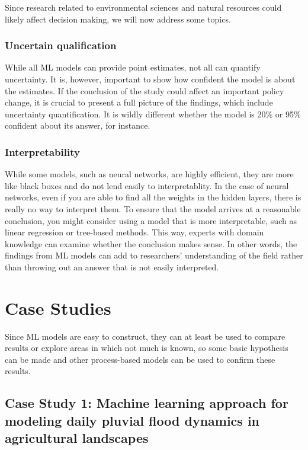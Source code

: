 \documentclass[
]{book}
\begin{document}
Since research related to environmental sciences and natural resources could likely affect decision making, we will now address some topics.

\hypertarget{uncertain-qualification}{%
\subsection{Uncertain qualification}\label{uncertain-qualification}}

While all ML models can provide point estimates, not all can quantify uncertainty. It is, however, important to show how confident the model is about the estimates. If the conclusion of the study could affect an important policy change, it is crucial to present a full picture of the findings, which include uncertainty quantification. It is wildly different whether the model is 20\% or 95\% confident about its answer, for instance.

\hypertarget{interpretability}{%
\subsection{Interpretability}\label{interpretability}}

While some models, such as neural networks, are highly efficient, they are more like black boxes and do not lend easily to interpretablity. In the case of neural networks, even if you are able to find all the weights in the hidden layers, there is really no way to interpret them. To ensure that the model arrives at a reasonable conclusion, you might consider using a model that is more interpretable, such as linear regression or tree-based methods. This way, experts with domain knowledge can examine whether the conclusion makes sense. In other words, the findings from ML models can add to researchers' understanding of the field rather than throwing out an answer that is not easily interpreted.

\hypertarget{case-studies}{%
\chapter{Case Studies}\label{case-studies}}

Since ML models are easy to construct, they can at least be used to compare results or explore areas in which not much is known, so some basic hypothesis can be made and other process-based models can be used to confirm these results.

\hypertarget{case-study-1-machine-learning-approach-for-modeling-daily-pluvial-flood-dynamics-in-agricultural-landscapes}{%
\section{Case Study 1: Machine learning approach for modeling daily pluvial flood dynamics in agricultural landscapes}\label{case-study-1-machine-learning-approach-for-modeling-daily-pluvial-flood-dynamics-in-agricultural-landscapes}}
\end{document}
